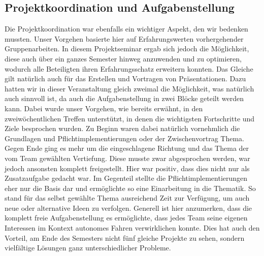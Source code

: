 \subsection{Projektkoordination und Aufgabenstellung}
Die Projektkoordination war ebenfalls ein wichtiger Aspekt, den wir bedenken mussten. Unser Vorgehen basierte hier auf Erfahrungswerten vorhergehender Gruppenarbeiten. In diesem Projektseminar ergab sich jedoch die Möglichkeit, diese auch über ein ganzes Semester hinweg anzuwenden und zu optimieren, wodurch alle Beteiligten ihren Erfahrungsschatz erweitern konnten. Das Gleiche gilt natürlich auch für das Erstellen und Vortragen von Präsentationen. Dazu hatten wir in dieser Veranstaltung gleich zweimal die Möglichkeit, was natürlich auch sinnvoll ist, da auch die Aufgabenstellung in zwei Blöcke geteilt werden kann. Dabei wurde unser Vorgehen, wie bereits erwähnt, in den zweiwöchentlichen Treffen unterstützt, in denen die wichtigsten Fortschritte und Ziele besprochen wurden. Zu Beginn waren dabei natürlich vornehmlich die Grundlagen und Pflichtimplementierungen oder der Zwischenvortrag Thema. Gegen Ende ging es mehr um die eingeschlagene Richtung und das Thema der vom Team gewählten Vertiefung. Diese musste zwar abgesprochen werden, war jedoch ansonsten komplett freigestellt. Hier war positiv, dass dies nicht nur als Zusatzaufgabe gedacht war. Im Gegenteil stellte die Pflichtimplementierungen eher nur die Basis dar und ermöglichte so eine Einarbeitung in die Thematik. So stand für das selbst gewählte Thema ausreichend Zeit zur Verfügung, um auch neue oder alternative Ideen zu verfolgen.
\newline
Generell ist hier anzumerken, dass die komplett freie Aufgabenstellung es ermöglichte, dass jedes Team seine eigenen  Interessen im Kontext autonomes Fahren verwirklichen konnte. Dies hat auch den Vorteil, am Ende des Semesters nicht fünf gleiche Projekte zu sehen, sondern vielfältige Lösungen ganz unterschiedlicher Probleme.

